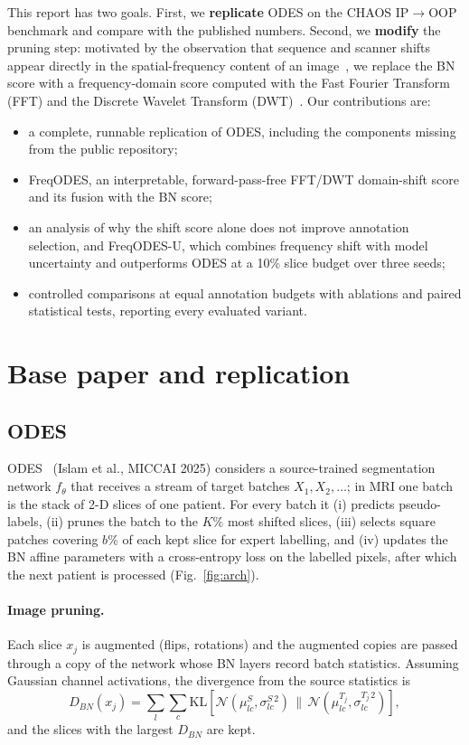 \documentclass[a4paper,fleqn]{cas-sc}
\begin{document}
This report has two goals. First, we \textbf{replicate} ODES on the CHAOS IP$\rightarrow$OOP benchmark and compare with the published numbers. Second, we \textbf{modify} the pruning step: motivated by the observation that sequence and scanner shifts appear directly in the spatial-frequency content of an image~\cite{yang2020fda}, we replace the BN score with a frequency-domain score computed with the Fast Fourier Transform (FFT) and the Discrete Wavelet Transform (DWT)~\cite{mallat1989wavelet}. Our contributions are:
\begin{itemize}
  \item a complete, runnable replication of ODES, including the components missing from the public repository;
  \item FreqODES, an interpretable, forward-pass-free FFT/DWT domain-shift score and its fusion with the BN score;
  \item an analysis of why the shift score alone does not improve annotation selection, and FreqODES-U, which combines frequency shift with model uncertainty and outperforms ODES at a 10\% slice budget over three seeds;
  \item controlled comparisons at equal annotation budgets with ablations and paired statistical tests, reporting every evaluated variant.
\end{itemize}

\section{Base paper and replication}
\subsection{ODES}
ODES~\cite{islam2025odes} (Islam et al., MICCAI 2025) considers a source-trained segmentation network $f_\theta$ that receives a stream of target batches $X_1,X_2,\dots$; in MRI one batch is the stack of 2-D slices of one patient. For every batch it (i) predicts pseudo-labels, (ii) prunes the batch to the $K\%$ most shifted slices, (iii) selects square patches covering $b\%$ of each kept slice for expert labelling, and (iv) updates the BN affine parameters with a cross-entropy loss on the labelled pixels, after which the next patient is processed (Fig.~\ref{fig:arch}).

\paragraph{Image pruning.} Each slice $x_j$ is augmented (flips, rotations) and the augmented copies are passed through a copy of the network whose BN layers record batch statistics. Assuming Gaussian channel activations, the divergence from the source statistics is
\begin{equation}
D_{BN}(x_j)=\sum_{l}\sum_{c}\mathrm{KL}\!\left[\mathcal{N}(\mu^S_{lc},\sigma^{S\,2}_{lc})\,\big\|\,\mathcal{N}(\mu^{T_j}_{lc},\sigma^{T_j\,2}_{lc})\right],
\end{equation}
and the slices with the largest $D_{BN}$ are kept.
\end{document}
